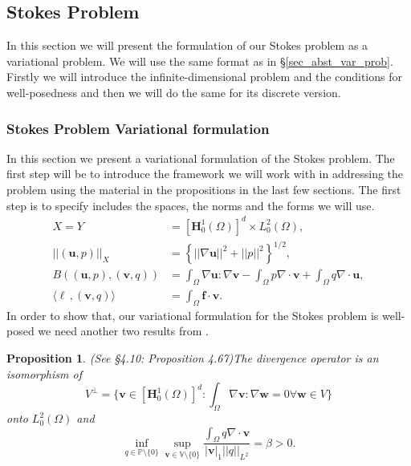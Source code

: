 \documentclass[12pt,a4paper]{article}
\newtheorem{proposition}[theorem]{Proposition}
\theoremstyle{definition}
\begin{document}
\subsection{Stokes Problem}
In this section we will present the formulation of our Stokes problem as a variational problem.  We will use the same format as in \S \ref{sec_abst_var_prob}.  Firstly we will introduce the infinite-dimensional problem and the conditions for well-posedness and then we will do the same for its discrete version.  
\subsubsection{Stokes Problem Variational formulation}
In this section we present a variational formulation of the Stokes problem.  The first step will be to introduce the framework we will work with in addressing the problem using the material in the propositions in the last few sections.  The first step is to specify includes the spaces, the norms and the forms we will use.
\begin{equation}\label{verf_eqns}
\begin{aligned}
X=Y&=\left[\textbf{H}^1_0\left(\Omega\right)\right]^d\times L^2_0\left(\Omega\right),\\
\left|\left|\left(\textbf{u},p\right)\right|\right|_X&=\left\lbrace \left|\left|\nabla\textbf{u}\right|\right|^2 + \left|\left|p\right|\right|^2\right\rbrace^{1/2},\\
B\left(\left(\textbf{u},p\right),\left(\textbf{v},q\right)\right)&=\int_{\Omega}\nabla \textbf{u} : \nabla \textbf{v} - \int_{\Omega} p \nabla\cdot\textbf{v} + \int_{\Omega} q \nabla\cdot\textbf{u},\\
\langle \ell\,,\left(\textbf{v},q\right) \rangle &= \int_{\Omega}\textbf{f}\cdot \textbf{v}.
\end{aligned}
\end{equation}
In order to show that, our variational formulation for the Stokes problem is well-posed we need another two results from \cite{verfurth2013posteriori}.
\begin{proposition}(See \cite{verfurth2013posteriori} \S 4.10: Proposition 4.67)\label{prop_well_pos_verf_saddle_1}
	The divergence  operator is an isomorphism of 
	\begin{equation}
		V^{\perp} =\lbrace \textbf{v}\in \left[\textbf{H}^1_0\left(\Omega\right)\right]^d: \int_{\Omega}\nabla\textbf{v}:\nabla\textbf{w}=0 \forall \textbf{w}\in V \rbrace\nonumber
	\end{equation}
	onto $L^2_0\left(\Omega\right)$ and
	\begin{equation}\label{verf_infsup_q}
	\inf_{q\in \mathbb{P}\setminus \lbrace 0 \rbrace}\sup_{\textbf{v}\in \mathbb{V}\setminus \lbrace 0 \rbrace}\frac{\int_{\Omega}q\nabla\cdot\textbf{v}}{\left|\textbf{v}\right|_1 \left|\left|q\right|\right|_{L^2}}=\beta>0.\nonumber
	\end{equation}
\end{proposition}
\end{document}
